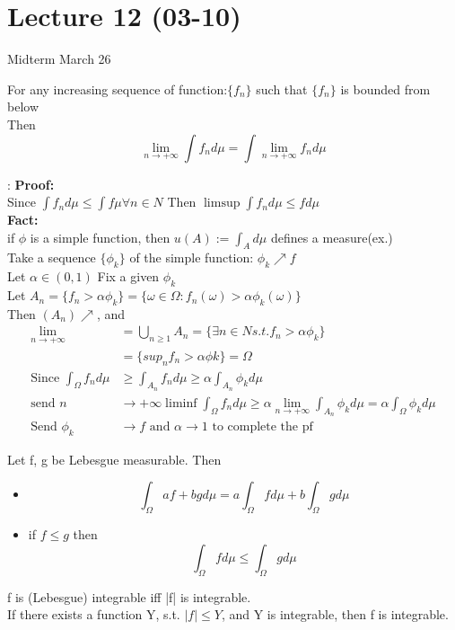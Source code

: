 \section{Lecture 12 (03-10)}
Midterm March 26
\begin{definition}{}
 For any increasing sequence of function:$ \{f_n\} $ such that $ \{f_n\} $ is bounded from below 
\\Then $$
    \lim_{n\rightarrow+\infty}\int f_n d\mu=\int \lim_{n\rightarrow+\infty}f_n d\mu
$$ 
\end{definition}:
\textbf{Proof:}
\\Since $ \int f_nd\mu\leq \int  f\mu \forall n\in N $ Then $ \limsup \int f_n d\mu\leq fd\mu $  
\\\textbf{Fact:}
\\if $ \phi $ is a simple function, then $ u(A):=\int_{A}d\mu $ defines a measure(ex.)
\\Take a sequence $ \{\phi_k\} $ of the simple function: $ \phi_k\nearrow f $    
\\Let $ \alpha\in(0,1) $ Fix a given $ \phi_k $
\\Let $ A_n=\{f_n>\alpha\phi_k\}=\{\omega\in\Omega:f_n(\omega)>\alpha\phi_k(\omega)\} $
\\Then $ (A_n)\nearrow  $, and \begin{align*}{}{}
\lim_{n\rightarrow+\infty}&=\bigcup_{n\geq1}A_n=\{\exists n\in N s.t.f_n>\alpha\phi_k\}\\
&=\{sup_nf_n>\alpha \phi k\}=\Omega\\
\text{Since } \int_{\Omega}f_nd\mu& \geq \int_{A_n}f_nd\mu\geq \alpha\int_{A_n}\phi_kd\mu\\
\text{send } n&\rightarrow+\infty \liminf \int_{\Omega} f_nd\mu\geq \alpha \lim_{n\rightarrow +\infty}\int_{A_n}\phi_kd\mu=\alpha\int_{\Omega}\phi_kd\mu\\
\text{Send } \phi_k &\rightarrow f \text{ and } \alpha\rightarrow 1 \text{ to complete the pf }
\end{align*}
\begin{proposition}[]{}
  Let  f, g be Lebesgue measurable. Then \begin{itemize}
 \item $$
    \int_{\Omega}af+bgd\mu=a\int_{\Omega}fd\mu+b\int_{\Omega}gd\mu
 $$ 
 \item if $ f\leq g $ then $$
    \int_{\Omega}fd\mu\leq \int_{\Omega}gd\mu
 $$  
 \end{itemize}
\end{proposition}
\begin{proposition}[]{}
    f is (Lebesgue) integrable iﬀ |f| is integrable.
    \\If there exists a function Y, s.t. $|f| \leq Y$, and Y is integrable, then f is integrable.
\end{proposition}
